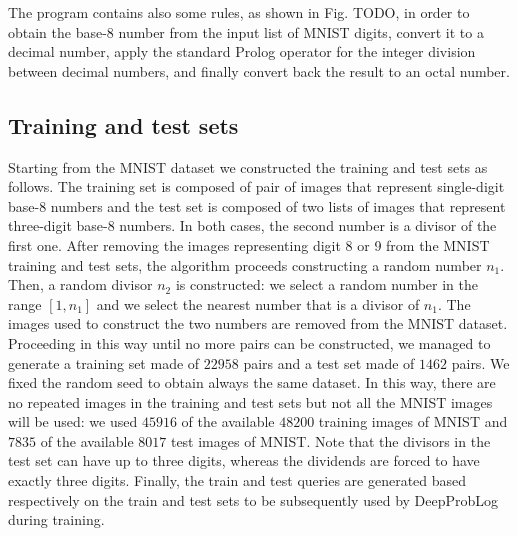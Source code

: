The program contains also some rules, as shown in Fig. TODO, in order to obtain the base-8 number from the input list of MNIST digits, convert it to a decimal number, apply the standard Prolog operator for the integer division between decimal numbers, and finally convert back the result to an octal number.





\subsection{Training and test sets}
Starting from the MNIST dataset we constructed the training and test sets as follows. The training set is composed of pair of images that represent single-digit base-8 numbers and the test set is composed of two lists of images that represent three-digit base-8 numbers. In both cases, the second number is a divisor of the first one. 
After removing the images representing digit 8 or 9 from the MNIST training and test sets, the algorithm proceeds constructing a random number $n_1$. Then, a random divisor $n_2$ is constructed: we select a random number in the range $[1,n_1]$ and we select the nearest number that is a divisor of $n_1$. The images used to construct the two numbers are removed from the MNIST dataset. Proceeding in this way until no more pairs can be constructed, we managed to generate a training set made of $22958$ pairs and a test set made of $1462$ pairs. We fixed the random seed to obtain always the same dataset. In this way, there are no repeated images in the training and test sets but not all the MNIST images will be used: we used $45916$ of the available $48200$ training images of MNIST and $7835$ of the available $8017$ test images of MNIST. Note that the divisors in the test set can have up to three digits, whereas the dividends are forced to have exactly three digits.
Finally, the train and test queries are generated based respectively on the train and test sets to be subsequently used by DeepProbLog during training.

